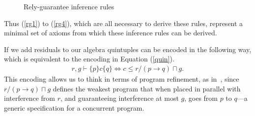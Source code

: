\documentclass{llncs}
\begin{document}
\begin{figure}[hbt]
\centering
\begin{prooftree}
\end{prooftree}

\begin{prooftree}
\end{prooftree}

\begin{prooftree}
\end{prooftree}

\begin{prooftree}
\end{prooftree}

\begin{prooftree}
\end{prooftree}

\begin{prooftree}
\end{prooftree}
\caption{Rely-guarantee inference rules}
\label{fig:rgrules}
\end{figure}

Thus (\ref{rg1}) to (\ref{rg4}), which are all necessary to derive these
rules, represent a minimal set of axioms from which these
inference rules can be derived.

If we add residuals to our algebra quintuples can be encoded in the
following way, which is equivalent to the encoding in Equation
(\ref{quin}).
\begin{align}
r, g \vdash \{p\} c \{q\} \iff c \le r/(p \rightarrow q) \sqcap g \label{refine}.
\end{align}
This encoding allows us to think in terms of program refinement, as in~\cite{hayes_refining_2013}, since
$r/(p \rightarrow q) \sqcap g$ defines the weakest program that when
placed in parallel with interference from $r$, and guaranteeing
interference at most $g$, goes from $p$ to $q$---a generic
specification for a concurrent program.
\end{document}
